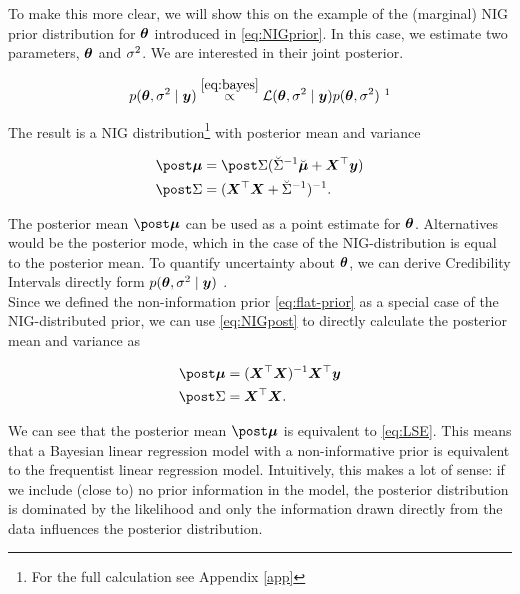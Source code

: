 To make this more clear, we will show this on the example of the (marginal) NIG prior distribution for $\bm{\theta}$ introduced in \eqref{eq:NIGprior}. In this case, we estimate two parameters, $\bm{\theta}$ and $\sigma^2$. We are interested in their joint posterior.

\begin{equation*}
    p(\btheta, \ssd \mid \by) \overset{\eqref{eq:bayes}}{\propto} \Lcal(\btheta, \ssd \mid \by) p(\btheta, \ssd) \ \footnotemark
\end{equation*}


The result is a NIG distribution\footnote{For the full calculation see Appendix \ref{app}} with posterior mean and variance


\begin{equation} \label{NIGpost}
    \begin{aligned}
        \mupo &= \Sdpo (\Sdipri \mupri + \bX^\top \by) \\
        \Sdpo &= (\bX^\top \bX + \Sdipri)^{-1}.
    \end{aligned}
\end{equation}

The posterior mean $\mupo$ can be used as a point estimate for $\bm{\theta}$. Alternatives would be the posterior mode, which in the case of the NIG-distribution is equal to the posterior mean. To quantify uncertainty about $\bm{\theta}$, we can derive Credibility Intervals directly form $p(\bm{\theta}, \sigma^2 \mid \bm{y})$ \citep{held_likelihood_2020}.\\

Since we defined the non-information prior \eqref{eq:flat-prior} as a special case of the NIG-distributed prior, we can use \eqref{eq:NIGpost} to directly calculate the posterior mean and variance as

\begin{equation*}
    \begin{aligned}
        \mupo &= (\bX^\top \bX)^{-1} \bX^\top \by \\
        \Sdpo &= \bX^\top \bX.
    \end{aligned}
\end{equation*}

We can see that the posterior mean $\mupo$ is equivalent to \eqref{eq:LSE}.
This means that a Bayesian linear regression model with a non-informative prior is equivalent to the frequentist linear regression model.
Intuitively, this makes a lot of sense: if we include (close to) no prior information in the model, the posterior distribution is dominated by the likelihood and only the information drawn directly from the data influences the posterior distribution.\\

